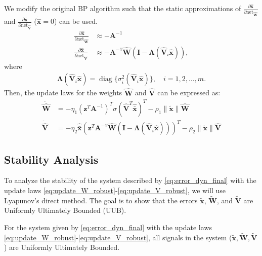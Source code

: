 \documentclass[10pt,twocolumn]{ICCAS}
\newcommand{\xtilde}{\tilde{\bm{x}}}
\newcommand{\xhatbar}{\hat{\bar{\bm{x}}}}
\newcommand{\Wtilde}{\tilde{\mathbf{W}}}
\newcommand{\What}{\hat{\mathbf{W}}}
\newcommand{\Vtilde}{\tilde{\mathbf{V}}}
\newcommand{\Vhat}{\hat{\mathbf{V}}}
\newcommand{\diag}{\operatorname{diag}}
\begin{document}
We modify the original BP algorithm such that the static approximations of $\frac{\partial \hat{\bm{x}}}{\partial \text{net}_{\hat{\mathbf{W}}}}$ and $\frac{\partial \hat{\bm{x}}}{\partial \text{net}_{\hat{\mathbf{V}}}}$ ($\dot{\hat{\bm{x}}} = 0$) can be used.
\begin{align*}
    \frac{\partial \hat{\bm{x}}}{\partial \text{net}_{\hat{\mathbf{W}}}} &\approx -\mathbf{A}^{-1} \nonumber \\
    \frac{\partial \hat{\bm{x}}}{\partial \text{net}_{\hat{\mathbf{V}}}} &\approx -{\mathbf{A}^{-1}}\hat{\mathbf{W}}({\mathbf{I}} -  {\mathbf{\Lambda}}(\hat{{\mathbf{V}}}_i\hat{\bm{x}})), 
\end{align*}
where
\begin{align*}
    {\mathbf{\Lambda}}(\hat{{\mathbf{V}}}_i\hat{\bm{x}})= \diag\{\sigma_i^2(\hat{{\mathbf{V}}}_i\hat{\bm{x}})\}, \quad i=1,2,\dots,m.
\end{align*}
Then, the update laws for the weights $\What$ and $\Vhat$ can be expressed as:
\begin{align}
    \dot{\What} &= -\eta_1 \left(\bm{z}^{T} \bm{A}^{-1}  \right)^{T} \sigma(\Vhat^T\xhatbar)^T - \rho_1 \|\xtilde\| \What \label{eq:update_W_robust} \\
    \dot{\Vhat} &= -\eta_2 \xhatbar \left( \bm{z}^T \bm{A}^{-1} \What ({\mathbf{I}} - {\mathbf{\Lambda}}(\hat{{\mathbf{V}}}_i\hat{\bm{x}})) \right)^T - \rho_2 \|\xtilde\| \Vhat \label{eq:update_V_robust}
\end{align}

\subsection{Stability Analysis}

To analyze the stability of the system described by \eqref{eq:error_dyn_final} with the update laws \eqref{eq:update_W_robust}-\eqref{eq:update_V_robust}, we will use Lyapunov's direct method. The goal is to show that the errors $\xtilde$, $\Wtilde$, and $\Vtilde$ are Uniformly Ultimately Bounded (UUB).
\begin{theorem}
For the system given by \eqref{eq:error_dyn_final} with the update laws \eqref{eq:update_W_robust}-\eqref{eq:update_V_robust}, all signals in the system ($\xtilde, \Wtilde, \Vtilde$) are Uniformly Ultimately Bounded.
\end{theorem}
\end{document}
